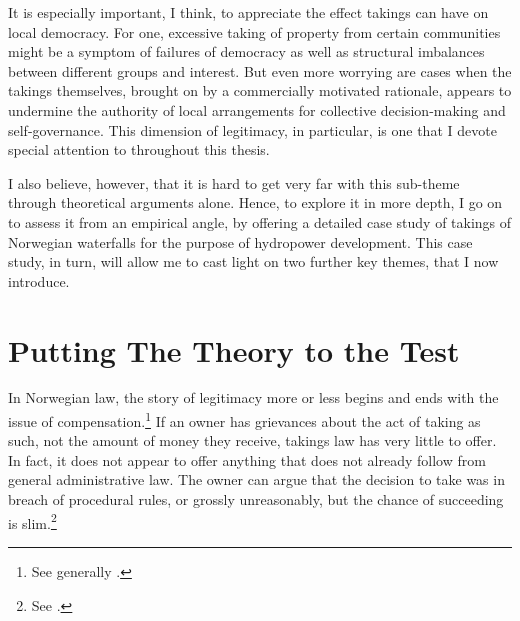 {It is especially important, I think, to appreciate the effect takings can have on local democracy. For one, excessive taking of property from certain communities might be a symptom of failures of democracy as well as structural imbalances between different groups and interest. But even more worrying are cases when the takings themselves, brought on by a commercially motivated rationale, appears to undermine the authority of local arrangements for collective decision-making and self-governance. This dimension of legitimacy, in particular, is one that I devote special attention to throughout this thesis.

I also believe, however, that it is hard to get very far with this sub-theme through theoretical arguments alone. Hence, to explore it in more depth, I go on to assess it from an empirical angle, by offering a detailed case study of takings of Norwegian waterfalls for the purpose of hydropower development. This case study, in turn, will allow me to cast light on two further key themes, that I now introduce. %
}

\section{Putting The Theory to the Test}\label{sec:1:3}

In Norwegian law, the story of legitimacy more or less begins and ends with the issue of compensation.\footnote{See generally \cite{dyrkolbotn15}.} If an owner has grievances about the act of taking as such, not the amount of money they receive, takings law has very little to offer. In fact, it does not appear to offer anything that does not already follow from general administrative law. The owner can argue that the decision to take was in breach of procedural rules, or grossly unreasonably, but the chance of succeeding is slim.\footnote{See \cite[384-386]{dyrkolbotn15b}.}



